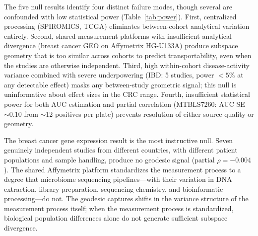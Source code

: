 \documentclass[11pt]{article}
\begin{document}
The five null results identify four distinct failure modes, though several are confounded with low statistical power (Table~\ref{tab:power}). First, centralized processing (SPIROMICS, TCGA) eliminates between-cohort analytical variation entirely. Second, shared measurement platforms with insufficient analytical divergence (breast cancer GEO on Affymetrix HG-U133A) produce subspace geometry that is too similar across cohorts to predict transportability, even when the studies are otherwise independent. Third, high within-cohort disease-activity variance combined with severe underpowering (IBD: 5 studies, power $< 5\%$ at any detectable effect) masks any between-study geometric signal; this null is uninformative about effect sizes in the CRC range. Fourth, insufficient statistical power for both AUC estimation and partial correlation (MTBLS7260: AUC SE $\sim 0.10$ from $\sim$12 positives per plate) prevents resolution of either source quality or geometry.

The breast cancer gene expression result is the most instructive null. Seven genuinely independent studies from different countries, with different patient populations and sample handling, produce no geodesic signal (partial $\rho = -0.004$). The shared Affymetrix platform standardizes the measurement process to a degree that microbiome sequencing pipelines---with their variation in DNA extraction, library preparation, sequencing chemistry, and bioinformatic processing---do not. The geodesic captures shifts in the variance structure of the measurement process itself; when the measurement process is standardized, biological population differences alone do not generate sufficient subspace divergence.
\end{document}
